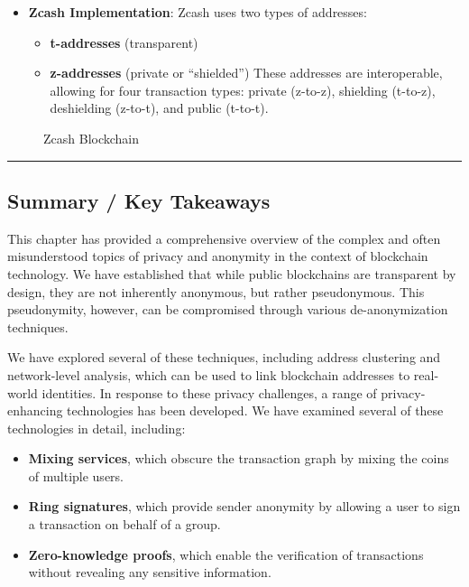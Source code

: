 \begin{itemize}
\tightlist
\item
  \textbf{Zcash Implementation}: Zcash uses two types of addresses:

  \begin{itemize}
  \tightlist
  \item
    \textbf{t-addresses} (transparent)
  \item
    \textbf{z-addresses} (private or ``shielded'') These addresses are
    interoperable, allowing for four transaction types: private
    (z-to-z), shielding (t-to-z), deshielding (z-to-t), and public
    (t-to-t).
  \end{itemize}
\end{itemize}

\begin{figure}
\centering
\caption{Zcash Blockchain}
\end{figure}

\begin{center}\rule{0.5\linewidth}{0.5pt}\end{center}

\subsection{Summary / Key Takeaways}\label{summary-key-takeaways}

This chapter has provided a comprehensive overview of the complex and
often misunderstood topics of privacy and anonymity in the context of
blockchain technology. We have established that while public blockchains
are transparent by design, they are not inherently anonymous, but rather
pseudonymous. This pseudonymity, however, can be compromised through
various de-anonymization techniques.

We have explored several of these techniques, including address
clustering and network-level analysis, which can be used to link
blockchain addresses to real-world identities. In response to these
privacy challenges, a range of privacy-enhancing technologies has been
developed. We have examined several of these technologies in detail,
including:

\begin{itemize}
\tightlist
\item
  \textbf{Mixing services}, which obscure the transaction graph by
  mixing the coins of multiple users.
\item
  \textbf{Ring signatures}, which provide sender anonymity by allowing a
  user to sign a transaction on behalf of a group.
\item
  \textbf{Zero-knowledge proofs}, which enable the verification of
  transactions without revealing any sensitive information.
\end{itemize}

